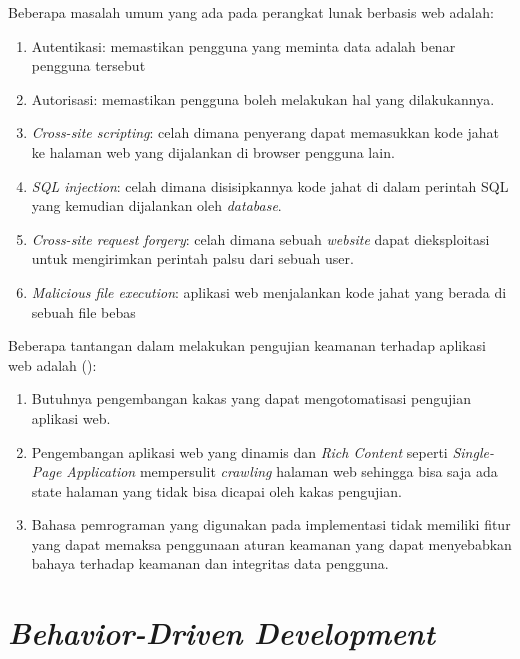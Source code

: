 Beberapa masalah umum yang ada pada perangkat lunak berbasis web adalah:
\begin{enumerate}
  \item Autentikasi: memastikan pengguna yang meminta data adalah benar pengguna tersebut
  \item Autorisasi: memastikan pengguna boleh melakukan hal yang dilakukannya.

  \item \emph{Cross-site scripting}:
        celah dimana penyerang dapat memasukkan kode jahat ke halaman web yang dijalankan di browser pengguna lain.

  \item \emph{SQL injection}:
        celah dimana disisipkannya kode jahat di dalam perintah SQL yang kemudian dijalankan oleh \emph{database}.

  \item \emph{Cross-site request forgery}:
        celah dimana sebuah \emph{website} dapat dieksploitasi untuk mengirimkan perintah palsu dari sebuah user.

  \item \emph{Malicious file execution}:
        aplikasi web menjalankan kode jahat yang berada di sebuah file bebas
\end{enumerate}

Beberapa tantangan dalam melakukan pengujian keamanan terhadap aplikasi web adalah (\cite{websecchal}):
\begin{enumerate}
  \item Butuhnya pengembangan kakas yang dapat mengotomatisasi pengujian aplikasi web.

  \item Pengembangan aplikasi web yang dinamis dan \emph{Rich Content} seperti \emph{Single-Page Application}
        mempersulit \emph{crawling} halaman web sehingga bisa saja ada state halaman yang
        tidak bisa dicapai oleh kakas pengujian.

  \item Bahasa pemrograman yang digunakan pada implementasi tidak memiliki fitur yang
        dapat memaksa penggunaan aturan keamanan yang dapat menyebabkan bahaya terhadap keamanan
        dan integritas data pengguna.
\end{enumerate}



\section{\emph{Behavior-Driven Development}}

